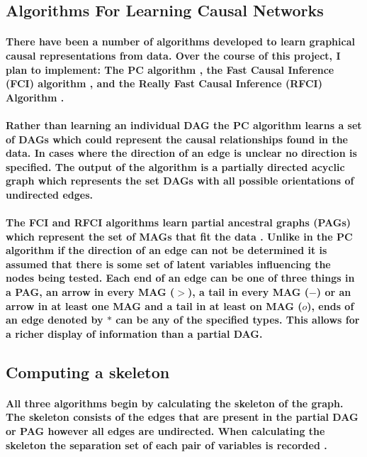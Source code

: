 \documentclass{article}
\begin{document}
\subsection{Algorithms For Learning Causal Networks}
\paragraph{ There have been a number of algorithms developed to learn graphical causal representations from data. Over the course of this project, I plan to implement: The PC algorithm \cite{spirtes1991algorithm}, the Fast Causal Inference (FCI) algorithm \cite{colombo2012learning}, and the Really Fast Causal Inference (RFCI) Algorithm \cite{colombo2012learning}.}

\paragraph{Rather than learning an individual DAG the PC algorithm learns a set of DAGs which could represent the causal relationships found in the data. In cases where the direction of an edge is unclear no direction is specified. The output of the algorithm is a partially directed acyclic graph which represents the set DAGs with all possible orientations of undirected edges\cite{spirtes1991algorithm}.}

\paragraph{The FCI and RFCI algorithms learn partial ancestral graphs (PAGs) which represent the set of MAGs that fit the data \cite{colombo2012learning}. Unlike in the PC algorithm if the direction of an edge can not be determined it is assumed that there is some set of latent variables influencing the nodes being tested. Each end of an edge can be one of three things in a PAG, an arrow in every MAG ($>$), a tail in every MAG ($-$) or an arrow in at least one MAG and a tail in at least on MAG ($o$), ends of an edge denoted by $*$ can be any of the specified types. This allows for a richer display of information than a partial DAG\cite{colombo2012learning}.}

\subsection{Computing a skeleton}
\paragraph{All three algorithms begin by calculating the skeleton of the graph. The skeleton consists of the edges that are present in the partial DAG or PAG however all edges are undirected. When calculating the skeleton the separation set of each pair of variables is recorded \cite{colombo2012learning, spirtes1991algorithm}.}
\end{document}
